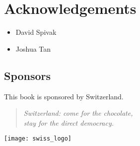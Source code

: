 
\section{Acknowledgements}

\begin{itemize}
    \item David Spivak
    \item Joshua Tan
\end{itemize}


\vfill

\subsection{Sponsors}

This book is sponsored by Switzerland.

\begin{quote}
    \itshape
    Switzerland: come for the chocolate,\\
    stay for the direct democracy.
\end{quote}

\begin{marginfigure}
    \begin{center}
        \texttt{[image: swiss\_logo]}
    \end{center}
\end{marginfigure}



